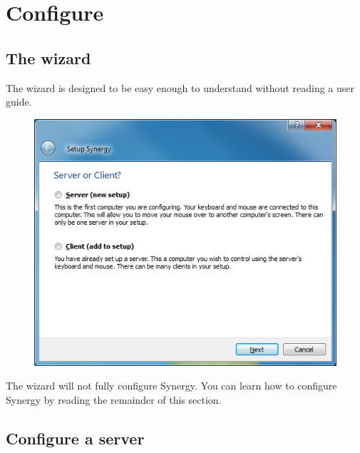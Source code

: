 \newcommand{\applyhint}{
Now you need to apply the configuration. If you selected
"Service" in the wizard, then click "Apply". This will restart any
running process and apply the new configuration. Otherwise, if
you are using "Desktop" mode, then you will need to click "Start" (or
if the process is already running, click "Stop" before configuring,
then "Start" after you're done).
}

\section{Configure}

\subsection{The wizard}

The wizard is designed to be easy enough to understand without reading
a user guide.

\begin{figure}[H]
\includegraphics[scale=.75]{graphics/windows-wizard.png}
\end{figure}

The wizard will not fully configure Synergy. You can learn how to configure
Synergy by reading the remainder of this section.

\subsection{Configure a server}

